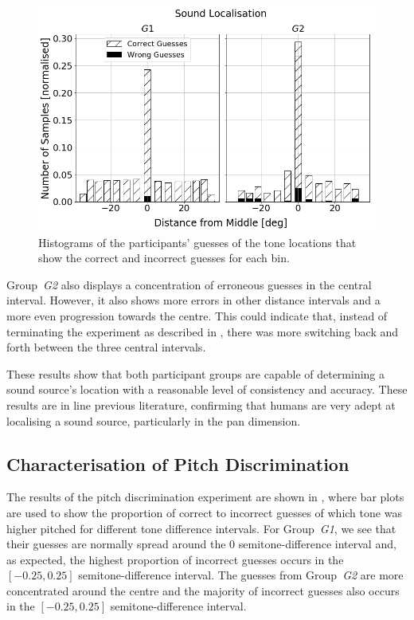 \documentclass[]{interact}
\begin{document}
\begin{figure}
  \centering
  \includegraphics[width=1.0\textwidth]{figures/sound_localisation.png}
  \caption{Histograms of the participants' guesses of the tone locations that show the correct and incorrect guesses for each bin. }\label{fig:sound-localisation}
\end{figure}

Group~\textit{G2} also displays a concentration of erroneous guesses in the central interval.
However, it also shows more errors in other distance intervals and a more even progression towards the centre.
This could indicate that, instead of terminating the experiment as described in , there was more switching back and forth between the three central intervals. 

These results show that both participant groups are capable of determining a sound source's location with a reasonable level of consistency and accuracy.
These results are in line previous literature, confirming that humans are very adept at localising a sound source, particularly in the pan dimension. 

\subsection{Characterisation of Pitch Discrimination}

The results of the pitch discrimination experiment are shown in , where bar plots are used to show the proportion of correct to incorrect guesses of which tone was higher pitched for different tone difference intervals. 
For Group~\textit{G1}, we see that their guesses are normally spread around the 0 semitone-difference interval and, as expected, the highest proportion of incorrect guesses occurs in the $[-0.25, 0.25]$ semitone-difference interval. 
The guesses from Group~\textit{G2} are more concentrated around the centre and the majority of incorrect guesses also occurs in the $[-0.25, 0.25]$ semitone-difference interval.
\end{document}
